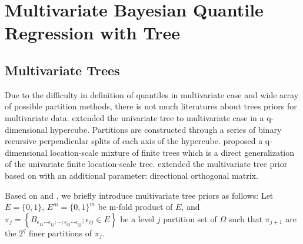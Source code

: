 \section{Multivariate Bayesian Quantile Regression with \polya{} Tree}
\label{sec:multi}

\subsection{Multivariate \polya{} Trees}

Due to the difficulty in definition of quantiles in multivariate case
and wide array of possible partition methods, there is not much literatures
about \polya{} trees priors for multivariate data. \citet{paddock1999,
  paddock2002} extended the univariate \polya{} tree
\citep{lavine1992,lavine1994} to multivariate case in a
q-dimensional hypercube. Partitions are constructed through a series
of binary recursive perpendicular splits of each axis of the
hypercube. \citet{hanson2006} proposed a q-dimensional location-scale
mixture of finite \polya{} trees which is a direct generalization of
the univariate finite location-scale \polya{} tree. \citet{jara2009}
extended the multivariate \polya{} tree prior based on
\citet{hanson2006} with an additional parameter: directional
orthogonal matrix.

Based on \citet{hanson2006} and \citet{jara2009}, we briefly introduce
multivariate \polya{} tree priors as follows: Let $E=\{0,1\}$,
$E^m=\{0,1\}^m$ be m-fold product of $E$, and $\pi_j = \left\{
  B_{\epsilon_{11}\cdots
    \epsilon_{1j};\cdots;\epsilon_{q1}\cdots\epsilon_{qj}};
  \epsilon_{ij}\in E \right\}$ be a level $j$ partition set of
$\Omega$ such that $\pi_{j+1}$ are the $2^q$ finer partitions of
$\pi_j$.


